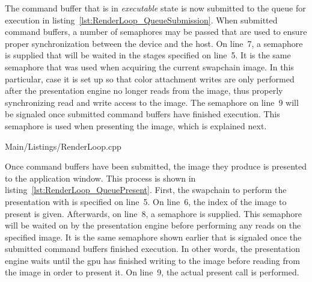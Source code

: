    The command buffer that is in \textit{executable} state is now submitted to the queue for execution in listing~\ref{lst:RenderLoop_QueueSubmission}.
    When submitted command buffers, a number of semaphores may be passed that are used to ensure proper synchronization between the device and the host.
    On line~7, a semaphore is supplied that will be waited in the stages specified on line~5.
    It is the same semaphore that was used when acquiring the current swapchain image.
    In this particular, case it is set up so that color attachment writes are only performed after the presentation engine no longer reads from the image, thus properly synchronizing read and write access to the image.
    The semaphore on line~9 will be signaled once submitted command buffers have finished execution.
    This semaphore is used when presenting the image, which is explained next.


    
    {Main/Listings/RenderLoop.cpp}

    Once command buffers have been submitted, the image they produce is presented to the application window.
    This process is shown in listing~\ref{lst:RenderLoop_QueuePresent}.
    First, the swapchain to perform the presentation with is specified on line~5.
    On line~6, the index of the image to present is given.
    Afterwards, on line~8, a semaphore is supplied.
    This semaphore will be waited on by the presentation engine before performing any reads on the specified image.
    It is the same semaphore shown earlier that is signaled once the submitted command buffers finished execution.
    In other words, the presentation engine waits until the \gls{gpu} has finished writing to the image before reading from the image in order to present it.
    On line~9, the actual present call is performed.





